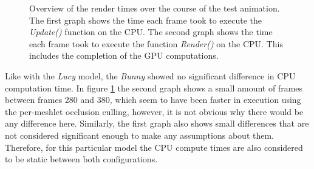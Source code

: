 \begin{figure}[!htb]              %
  \begin{center}
    \caption{Overview of the render times over the course of the test animation. The first graph shows the time 
    each frame took to execute the \emph{Update()} function on the \ac{CPU}. The second graph shows the time each 
    frame took to execute the function \emph{Render()} on the \ac{CPU}. This includes the completion of the 
    \ac{GPU} computations.}
    \label{plt:bunny-256-culling-cpu-time}
  \end{center}
\end{figure}


\noindent
Like with the \emph{Lucy} model, the \emph{Bunny} showed no significant difference in \ac{CPU} computation time. 
In figure \ref{plt:bunny-256-culling-cpu-time} the second graph shows a small amount of frames between frames 280 
and 380, which seem to have been faster in execution using the per-meshlet occlusion culling, however, it is not 
obvious why there would be any difference here. Similarly, the first graph also shows small differences that are 
not considered significant enough to make any assumptions about them. Therefore, for this particular model the 
\ac{CPU} compute times are also considered to be static between both configurations.

